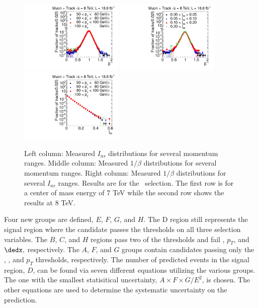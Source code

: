 \begin{figure}%
\begin{center}
\includegraphics[clip=true, trim=0.0cm 0cm 3.0cm 0cm, width=0.44\textwidth]{figures/tkmu/Control_Data8TeV_Pt_TOFSpectrum}
\includegraphics[clip=true, trim=0.0cm 0cm 3.0cm 0cm, width=0.44\textwidth]{figures/tkmu/Control_Data8TeV_Is_TOFSpectrumLog}
\includegraphics[clip=true, trim=0.0cm 0cm 3.0cm 0cm, width=0.44\textwidth]{figures/tkmu/Control_Data8TeV_Pt_IsSpectrum}
\caption{Left column: Measured $I_{as}$ distributions for several momentum ranges.  Middle column:
Measured $1/\beta$ distributions for several momentum ranges. Right column:  Measured $1/\beta$ distributions for several $I_{as}$  ranges.
Results are for the \tktof\ selection.
The first row is for a center of mass energy of 7 TeV while the second row shows the results at 8 TeV.}
\label{fig:correlation}
\end{center}
\end{figure}

Four new groups are defined, $E$, $F$, $G$, and $H$. The D region still represents
the signal region where the candidate passes the thresholds on all three selection variables. The $B$, $C$, and $H$ regions pass two of the thresholds and fail \invbeta,
$p_T$, and $\dedx,$ respectively. The $A$, $F$, and $G$ groups contain candidates passing only the \dedx, \invbeta, and $p_T$ thresholds, respectively.
The number of predicted events in the signal region, $D$, can be found via seven different equations utilizing the various groups. The one with the smallest
statisitical uncertainty, $A\times F\times G/E^2$, is chosen. The other equations are used to determine the systematic uncertainty on the prediction.

